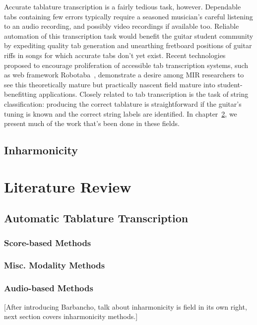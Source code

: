 \documentclass[12pt]{cmuthesis}
\begin{document}
Accurate tablature transcription is a fairly tedious task, however. Dependable tabs containing few errors typically require a seasoned musician's careful listening to an audio recording, and possibly video recordings if available too. Reliable automation of this transcription task would benefit the guitar student community by expediting quality tab generation and unearthing fretboard positions of guitar riffs in songs for which accurate tabs don't yet exist. Recent technologies proposed to encourage proliferation of accessible tab transcription systems, such as web framework Robotaba~\cite{burlet2013}, demonstrate a desire among MIR researchers to see this theoretically mature but practically nascent field mature into student-benefitting applications. Closely related to tab transcription is the task of string classification: producing the correct tablature is straightforward if the guitar's tuning is known and the correct string labels are identified. In chapter~\ref{lit-review}, we present much of the work that's been done in these fields.

\section{Inharmonicity} 

\noindent
\chapter{Literature Review} \label{lit-review}
\section{Automatic Tablature Transcription}
\subsection{Score-based Methods}
\subsection{Misc. Modality Methods}
\subsection{Audio-based Methods}
[After introducing Barbancho, talk about inharmonicity is field in its own right, next section covers inharmonicity methods.]
\end{document}
